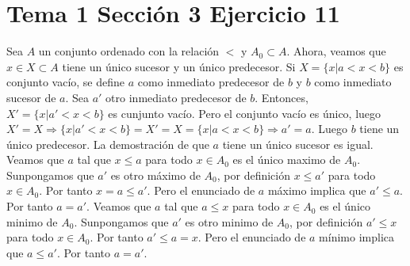 \documentclass{article}
\begin{document}
\section{Tema 1 Sección 3 Ejercicio 11}
Sea \(A\) un conjunto ordenado con la relación \(<\) y \(A_0\subset A\). Ahora, veamos que \(x\in X\subset A\) tiene un único sucesor y un único predecesor. Si \(X=\{x| a<x<b\}\) es conjunto vacío, se define \(a\) como inmediato predecesor de \(b\) y \(b\) como inmediato sucesor de \(a\). Sea \(a'\) otro inmediato predecesor de \(b\). Entonces, \(X'=\{x| a'<x<b\}\) es cunjunto vacío. Pero el conjunto vacío es único, luego \(X'=X\Rightarrow \{x| a'<x<b\}=X'=X=\{x| a<x<b\}\Rightarrow a'=a\). Luego \(b\) tiene un único predecesor. La demostración de que \(a\) tiene un único sucesor es igual. Veamos que \(a\) tal que \(x\leq a\) para todo \(x\in A_0\) es el único maximo de \(A_0\). Sunpongamos que \(a'\) es otro máximo de \(A_0\), por definición \(x\leq a'\) para todo \(x\in A_0\). Por tanto \(x=a\leq a'\). Pero el enunciado de \(a\) máximo implica que  \(a'\leq a\). Por tanto \(a=a'\). Veamos que \(a\) tal que \(a\leq x\) para todo \(x\in A_0\) es el único minimo de \(A_0\). Sunpongamos que \(a'\) es otro minimo de \(A_0\), por definición \(a'\leq x\) para todo \(x\in A_0\). Por tanto \(a'\leq a=x\). Pero el enunciado de \(a\) mínimo implica que  \(a\leq a'\). Por tanto \(a=a'\). 
\end{document}

